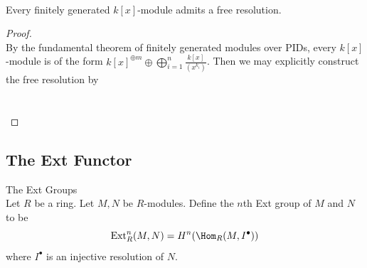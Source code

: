 \documentclass[a4paper]{article}
\begin{document}
\begin{eg}{}{}\\
Every finitely generated $k[x]$-module admits a free resolution. 
\begin{proof}\\
By the fundamental theorem of finitely generated modules over PIDs, every $k[x]$-module is of the form $k[x]^{\oplus m}\oplus\bigoplus_{i=1}^n\frac{k[x]}{(x^{k_i})}$. Then we may explicitly construct the free resolution by \\
\\~\\
\end{proof}
\end{eg}

\subsection{The Ext Functor}
\begin{defn}{The Ext Groups}{}\\
Let $R$ be a ring. Let $M,N$ be $R$-modules. Define the $n$th Ext group of $M$ and $N$ to be $$\text{Ext}_R^n(M,N)=H^n(\Hom_R(M,I^\bullet))$$ where $I^\bullet$ is an injective resolution of $N$. 
\end{defn}
\end{document}
